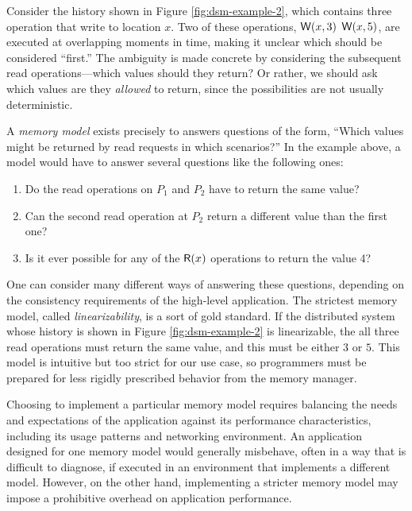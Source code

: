 \documentclass[]             %
{NASA}                       %
\theoremstyle{definition}
\newtheorem{example}[theorem]{Example}
\begin{document}

Consider the history shown in Figure \ref{fig:dsm-example-2}, which
contains three operation that write to location $x$. Two of these
operations, $\mathsf{W}\!\left(x, 3\right)$ $\mathsf{W}\!\left(x, 5\right)$, are executed at
overlapping moments in time, making it unclear which should be
considered ``first.'' The ambiguity is made concrete by considering
the subsequent read operations---which values should they return? Or
rather, we should ask which values are they \emph{allowed} to return,
since the possibilities are not usually deterministic.

A \emph{memory model} exists precisely to answers questions of the
form, ``Which values might be returned by read requests in which
scenarios?'' In the example above, a model would have to answer
several questions like the following ones:
\begin{enumerate}
\item Do the read operations on $P_1$ and $P_2$ have to return the same value?
\item Can the second read operation at $P_2$ return a different value
  than the first one?
\item Is it ever possible for any of the $\mathsf{R}\!\left(x\right)$ operations to
  return the value 4?
\end{enumerate}

One can consider many different ways of answering these questions,
depending on the consistency requirements of the high-level
application. The strictest memory model, called
\emph{linearizability}, is a sort of gold standard. If the distributed
system whose history is shown in Figure \ref{fig:dsm-example-2} is
linearizable, the all three read operations must return the same
value, and this must be either $3$ or $5$. This model is intuitive but
too strict for our use case, so programmers must be prepared for less
rigidly prescribed behavior from the memory manager.

Choosing to implement a particular memory model requires balancing the
needs and expectations of the application against its performance
characteristics, including its usage patterns and networking
environment. An application designed for one memory model would
generally misbehave, often in a way that is difficult to diagnose, if
executed in an environment that implements a different model. However,
on the other hand, implementing a stricter memory model may impose a
prohibitive overhead on application performance.
\end{document}
